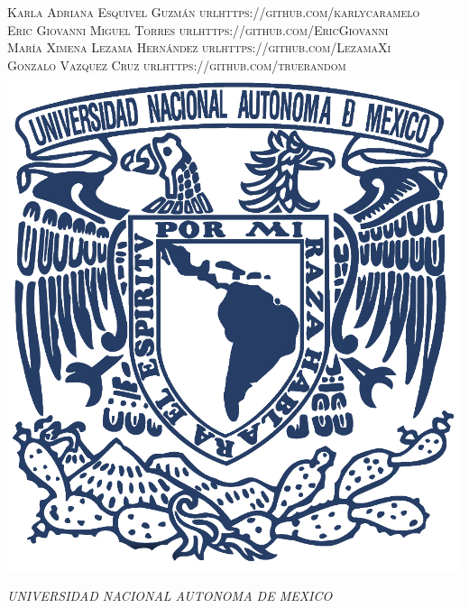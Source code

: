 \documentclass[a4paper, 11pt, oneside]{article}
\begin{document}
\begin{titlepage}
	{\scshape\Large Karla Adriana Esquivel Guzmán url{https://github.com/karlycaramelo} \\
    Eric Giovanni Miguel Torres url{https://github.com/EricGiovanni}\\ 
    María Ximena Lezama Hernández url{https://github.com/LezamaXi}\\ 
    Gonzalo Vazquez Cruz url{https://github.com/truerandom}} 
	\vspace{0.5\baselineskip} 
	\vfill
	\includegraphics{unam.jpg}
	
	\textit{UNIVERSIDAD NACIONAL AUTONOMA DE MEXICO} 
	
	
	
	
	
	\vspace{0.3\baselineskip} 
	
	
	 

\end{titlepage}
\newpage
\end{document}
